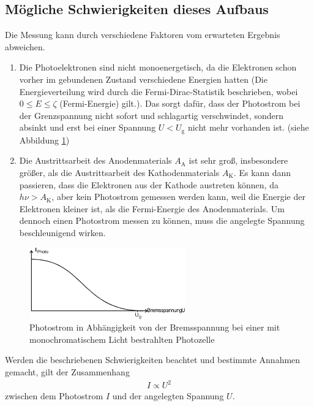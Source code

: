 \subsection{Mögliche Schwierigkeiten dieses Aufbaus}
Die Messung kann durch verschiedene Faktoren vom erwarteten Ergebnis abweichen.
\begin{enumerate}
	\item Die Photoelektronen sind nicht monoenergetisch, da die Elektronen schon vorher im gebundenen Zustand verschiedene Energien hatten (Die Energieverteilung wird durch die Fermi-Dirac-Statistik beschrieben, wobei $0\leq E\leq\zeta$ (Fermi-Energie) gilt.). Das sorgt dafür, dass der Photostrom bei der Grenzspannung nicht sofort und schlagartig verschwindet, sondern absinkt und erst bei einer Spannung $U<U_\text{g}$ nicht mehr vorhanden ist. (siehe Abbildung \ref{fig:UI})
	\item Die Austrittsarbeit des Anodenmaterials $A_\text{A}$ ist sehr groß, insbesondere größer, als die Austrittsarbeit des Kathodenmaterials $A_\text{K}$. Es kann dann passieren, dass die Elektronen aus der Kathode austreten können, da $h\nu>A_\text{K}$, aber kein Photostrom gemessen werden kann, weil die Energie der Elektronen kleiner ist, als die Fermi-Energie des Anodenmaterials. Um dennoch einen Photostrom messen zu können, muss die angelegte Spannung beschleunigend wirken.
\end{enumerate}
\begin{figure}[h!]
	\centering
	\includegraphics[width = 0.6\textwidth]{IU.png}
	\caption{Photostrom in Abhängigkeit von der Bremsspannung bei einer mit monochromatischem Licht bestrahlten Photozelle \cite{V500}}
	\label{fig:UI}
\end{figure}
Werden die beschriebenen Schwierigkeiten beachtet und bestimmte Annahmen gemacht, gilt der Zusammenhang
\begin{align}
	I \propto U^2
\end{align}
zwischen dem Photostrom $I$ und der angelegten Spannung $U$.